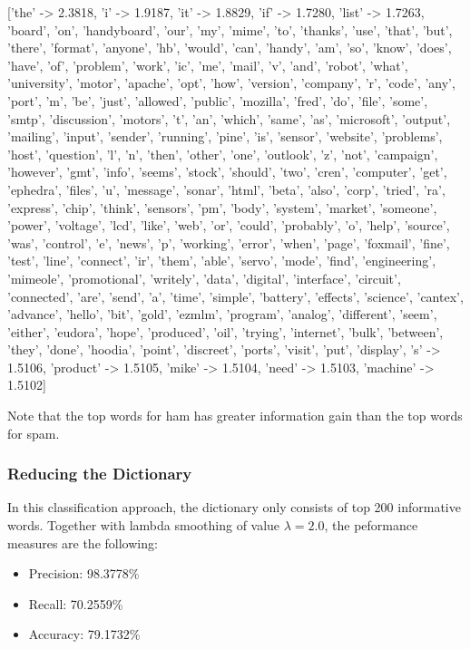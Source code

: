 \documentclass{article}
\begin{document}
['the' -> 2.3818, 'i' -> 1.9187, 'it' -> 1.8829, 'if' -> 1.7280, 'list' -> 1.7263, 'board', 'on', 'handyboard', 'our', 'my', 'mime', 'to', 'thanks', 'use', 'that', 'but', 'there', 'format', 'anyone', 'hb', 'would', 'can', 'handy', 'am', 'so', 'know', 'does', 'have', 'of', 'problem', 'work', 'ic', 'me', 'mail', 'v', 'and', 'robot', 'what', 'university', 'motor', 'apache', 'opt', 'how', 'version', 'company', 'r', 'code', 'any', 'port', 'm', 'be', 'just', 'allowed', 'public', 'mozilla', 'fred', 'do', 'file', 'some', 'smtp', 'discussion', 'motors', 't', 'an', 'which', 'same', 'as', 'microsoft', 'output', 'mailing', 'input', 'sender', 'running', 'pine', 'is', 'sensor', 'website', 'problems', 'host', 'question', 'l', 'n', 'then', 'other', 'one', 'outlook', 'z', 'not', 'campaign', 'however', 'gmt', 'info', 'seems', 'stock', 'should', 'two', 'cren', 'computer', 'get', 'ephedra', 'files', 'u', 'message', 'sonar', 'html', 'beta', 'also', 'corp', 'tried', 'ra', 'express', 'chip', 'think', 'sensors', 'pm', 'body', 'system', 'market', 'someone', 'power', 'voltage', 'lcd', 'like', 'web', 'or', 'could', 'probably', 'o', 'help', 'source', 'was', 'control', 'e', 'news', 'p', 'working', 'error', 'when', 'page', 'foxmail', 'fine', 'test', 'line', 'connect', 'ir', 'them', 'able', 'servo', 'mode', 'find', 'engineering', 'mimeole', 'promotional', 'writely', 'data', 'digital', 'interface', 'circuit', 'connected', 'are', 'send', 'a', 'time', 'simple', 'battery', 'effects', 'science', 'cantex', 'advance', 'hello', 'bit', 'gold', 'ezmlm', 'program', 'analog', 'different', 'seem', 'either', 'eudora', 'hope', 'produced', 'oil', 'trying', 'internet', 'bulk', 'between', 'they', 'done', 'hoodia', 'point', 'discreet', 'ports', 'visit', 'put', 'display', 's' -> 1.5106, 'product' -> 1.5105, 'mike' -> 1.5104, 'need' -> 1.5103, 'machine' -> 1.5102]

Note that the top words for ham has greater information gain than the top words for spam.

\subsubsection*{Reducing the Dictionary}
In this classification approach, the dictionary only consists of top 200 informative words. Together with lambda smoothing of value $\lambda = 2.0$, the peformance measures are the following:

\begin{itemize}
	\item Precision: 98.3778\%
	\item Recall: 70.2559\%
	\item Accuracy: 79.1732\%
\end{itemize}
\end{document}
